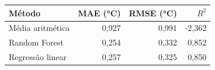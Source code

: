 \begin{tabular}{lrrr}
\toprule
Método & MAE (°C) & RMSE (°C) & $R^2$ \\
\midrule
Média aritmética & 0,927 & 0,991 & -2,362 \\
Random Forest & 0,254 & 0,332 & 0,852 \\
Regressão linear & 0,257 & 0,325 & 0,850 \\
\bottomrule
\end{tabular}
